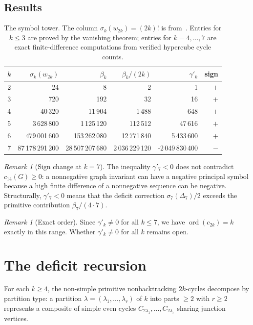 \documentclass[11pt]{amsart}
\newcommand{\ord}{\operatorname{ord}}
\theoremstyle{definition}
\theoremstyle{remark}
\newtheorem{remark}[theorem]{Remark}
\begin{document}
\subsection{Results}
\begin{table}[h]
\centering
\begin{tabular}{c|rrrrr}
$k$&$\sigma_k(w_{2k})$&$\beta_k$&$\beta_k/(2k)$&$\gamma'_k$&sign\\ \hline
2&24&8&2&1&$+$\\
3&720&192&32&16&$+$\\
4&40\,320&11\,904&1\,488&648&$+$\\
5&3\,628\,800&1\,125\,120&112\,512&47\,616&$+$\\
6&479\,001\,600&153\,262\,080&12\,771\,840&5\,433\,600&$+$\\
7&87\,178\,291\,200&28\,507\,207\,680&2\,036\,229\,120&-2\,049\,830\,400&$-$
\end{tabular}
\caption{The symbol tower. The column $\sigma_k(w_{2k})=(2k)!$ is from~\cite{RG}. Entries for $k\le3$ are proved by the vanishing theorem; entries for $k=4,\ldots,7$ are exact finite-difference computations from verified hypercube cycle counts.}
\end{table}

\begin{remark}[Sign change at $k=7$]
The inequality $\gamma'_7<0$ does not contradict $c_{14}(G)\ge0$: a nonnegative graph invariant can have a negative principal symbol because a high finite difference of a nonnegative sequence can be negative. Structurally, $\gamma'_7<0$ means that the deficit correction $\sigma_7(\Delta_7)/2$ exceeds the primitive contribution $\beta_7/(4\cdot7)$.
\end{remark}

\begin{remark}[Exact order]
Since $\gamma'_k\ne0$ for all $k\le7$, we have $\ord(c_{2k})=k$ exactly in this range. Whether $\gamma'_k\ne0$ for all $k$ remains open.
\end{remark}

\section{The deficit recursion}\label{sec:deficit-recursion}

For each $k\ge4$, the non-simple primitive nonbacktracking $2k$-cycles decompose by partition type: a partition $\lambda=(\lambda_1,\ldots,\lambda_r)$ of $k$ into parts $\ge2$ with $r\ge2$ represents a composite of simple even cycles $C_{2\lambda_1},\ldots,C_{2\lambda_r}$ sharing junction vertices.
\end{document}
